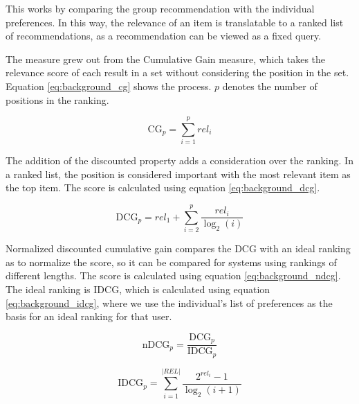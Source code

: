 This works by comparing the group recommendation with the individual preferences. In this way, the relevance of an item is translatable to a ranked list of recommendations, as a recommendation can be viewed as a fixed query.

The measure grew out from the Cumulative Gain measure, which takes the relevance score of each result in a set without considering the position in the set. Equation \ref{eq:background_cg} shows the process. $p$ denotes the number of positions in the ranking.

\begin{equation}\label{eq:background_cg}
	\text{CG}_p = \sum_{i=1}^{p}\textit{rel}_i
\end{equation}

The addition of the discounted property adds a consideration over the ranking. In a ranked list, the position is considered important with the most relevant item as the top item. The score is calculated using equation \ref{eq:background_dcg}.

\begin{equation}\label{eq:background_dcg}
	\text{DCG}_p = \textit{rel}_1 + \sum_{i=2}^{p}\frac{\textit{rel}_i}{\log_2(i)}
\end{equation}

Normalized discounted cumulative gain compares the DCG with an ideal ranking as to normalize the score, so it can be compared for systems using rankings of different lengths. The score is calculated using equation \ref{eq:background_ndcg}. The ideal ranking is IDCG, which is calculated using equation \ref{eq:background_idcg}, where we use the individual's list of preferences as the basis for an ideal ranking for that user.

\begin{equation}\label{eq:background_ndcg}
	\text{nDCG}_p = \frac{\text{DCG}_p}{\text{IDCG}_p}
\end{equation}

\begin{equation}\label{eq:background_idcg}
	\text{IDCG}_p = \sum_{i=1}^{|REL|} \frac{2^{\textit{rel}_i}-1}{\log_2(i+1)}
\end{equation}

